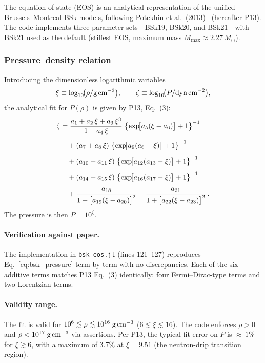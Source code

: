 The equation of state (EOS) is an analytical representation of the unified
Brussels--Montreal BSk models, following
Potekhin et al.\ (2013)~\cite{Potekhin2013} (hereafter P13).
The code implements three parameter sets---BSk19, BSk20, and BSk21---with
BSk21 used as the default (stiffest EOS, maximum mass
$M_{\max}\approx2.27\,M_{\odot}$).

\subsubsection{Pressure--density relation}

Introducing the dimensionless logarithmic variables
\begin{equation}
  \xi \equiv \log_{10}\!\bigl(\rho/\text{g\,cm}^{-3}\bigr),\qquad
  \zeta \equiv \log_{10}\!\bigl(P/\text{dyn\,cm}^{-2}\bigr),
  \label{eq:xi_zeta_def}
\end{equation}
the analytical fit for $P(\rho)$ is given by P13, Eq.~(3):
%
\begin{align}
  \zeta &= \frac{a_1 + a_2\,\xi + a_3\,\xi^{3}}{1 + a_4\,\xi}\;
           \bigl\{\exp\!\bigl[a_5(\xi - a_6)\bigr]+1\bigr\}^{-1}
           \notag\\[4pt]
  &\quad + (a_7 + a_8\,\xi)\;
           \bigl\{\exp\!\bigl[a_9(a_6 - \xi)\bigr]+1\bigr\}^{-1}
           \notag\\[4pt]
  &\quad + (a_{10} + a_{11}\,\xi)\;
           \bigl\{\exp\!\bigl[a_{12}(a_{13} - \xi)\bigr]+1\bigr\}^{-1}
           \notag\\[4pt]
  &\quad + (a_{14} + a_{15}\,\xi)\;
           \bigl\{\exp\!\bigl[a_{16}(a_{17} - \xi)\bigr]+1\bigr\}^{-1}
           \notag\\[4pt]
  &\quad + \frac{a_{18}}{1+\bigl[a_{19}(\xi - a_{20})\bigr]^{2}}
         + \frac{a_{21}}{1+\bigl[a_{22}(\xi - a_{23})\bigr]^{2}}\,.
  \label{eq:bsk_pressure}
\end{align}
%
The pressure is then $P = 10^{\zeta}$.

\paragraph{Verification against paper.}
The implementation in \texttt{bsk\_eos.jl} (lines 121--127) reproduces
Eq.~\eqref{eq:bsk_pressure} term-by-term with no discrepancies.
Each of the six additive terms matches P13 Eq.~(3) identically:
four Fermi--Dirac-type terms and two Lorentzian terms.

\paragraph{Validity range.}
The fit is valid for
$10^{6}\lesssim\rho\lesssim10^{16}\;\text{g\,cm}^{-3}$
($6\lesssim\xi\lesssim16$).
The code enforces $\rho>0$ and $\rho<10^{17}\;\text{g\,cm}^{-3}$ via
assertions.  Per P13, the typical fit error on $P$ is ${\approx}\,1\%$ for
$\xi\gtrsim6$, with a maximum of $3.7\%$ at $\xi=9.51$ (the neutron-drip
transition region).

